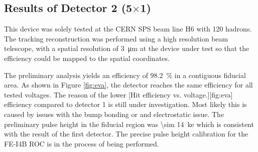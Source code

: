 \subsection{Results of Detector 2 (5$\times$1)}
This device was solely tested at the CERN SPS beam line H6 with \SI{120}{\gev} hadrons. The tracking reconstruction was performed using a high resolution beam telescope, with a spatial resolution of \SI{3}{\micro\meter} at the device under test so that the efficiency could be mapped to the spatial coordinates. \par
The preliminary analysis yields an efficiency of \SI{98.2}{\%} in a contiguous fiducial area. As shown in Figure \ref{fig:eva}, the detector reaches the same efficiency for all tested voltages. %
The reason of the lower 
[Hit efficiency vs. voltage.][fig:eva]
efficiency compared to detector 1 is still under investigation. Most likely this is caused by issues with the bump bonding or and electrostatic issue. The preliminary pulse height in the fiducial region was \SI{\sim 14}{\kilo e} which is consistent with the result of the first detector. The precise pulse height calibration for the FE-I4B \ac{ROC} is in the process of being performed.
